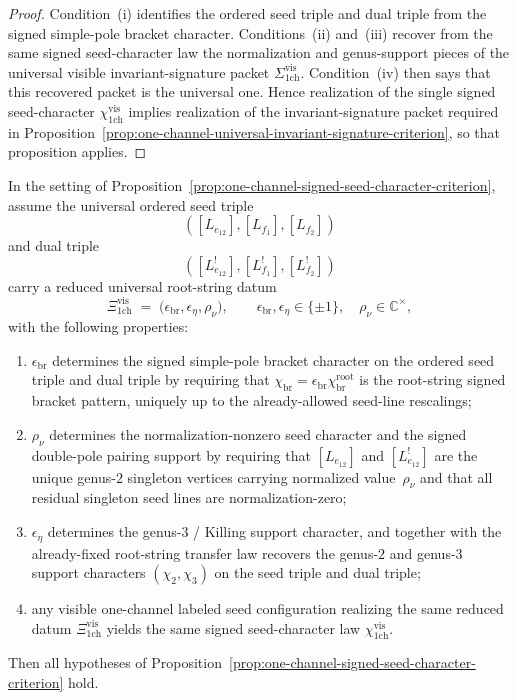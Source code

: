 \begin{proof}
Condition~\textup{(i)} identifies the ordered seed triple and dual
triple from the signed simple-pole bracket character.
Conditions~\textup{(ii)} and~\textup{(iii)} recover from the same
signed seed-character law the normalization and genus-support pieces of the
universal visible invariant-signature packet
$\Sigma_{\mathrm{1ch}}^{\mathrm{vis}}$.
Condition~\textup{(iv)} then says that this recovered packet is the
universal one.  Hence realization of the single signed seed-character
$\chi_{\mathrm{1ch}}^{\mathrm{vis}}$
implies realization of the invariant-signature packet required in
Proposition~\ref{prop:one-channel-universal-invariant-signature-criterion},
so that proposition applies.
\end{proof}

\begin{proposition}\label{prop:one-channel-two-sign-plus-normalization-scalar-criterion}
In the setting of
Proposition~\textup{\ref{prop:one-channel-signed-seed-character-criterion}},
assume the universal ordered seed triple
\[
([L_{e_{12}}],[L_{f_1}],[L_{f_2}])
\]
and dual triple
\[
([L_{e_{12}}^!],[L_{f_1}^!],[L_{f_2}^!])
\]
carry a reduced universal root-string datum
\[
\Xi_{\mathrm{1ch}}^{\mathrm{vis}}
\;=\;
\bigl(\epsilon_{\mathrm{br}},\epsilon_{\eta},\rho_{\nu}\bigr),
\qquad
\epsilon_{\mathrm{br}},\epsilon_{\eta}\in\{\pm 1\},
\quad
\rho_{\nu}\in\mathbb{C}^\times,
\]
with the following properties:
\begin{enumerate}[label=\textup{(\roman*)}]
\item $\epsilon_{\mathrm{br}}$ determines the signed simple-pole
  bracket character on the ordered seed triple and dual triple by
  requiring that
  $\chi_{\mathrm{br}}=\epsilon_{\mathrm{br}}\chi_{\mathrm{br}}^{\mathrm{root}}$
  is the root-string signed bracket pattern, uniquely up to the
  already-allowed seed-line rescalings;
\item $\rho_{\nu}$ determines the normalization-nonzero seed character
  and the signed double-pole pairing support by requiring that
  $[L_{e_{12}}]$ and $[L_{e_{12}}^!]$ are the unique genus-$2$
  singleton vertices carrying normalized value~$\rho_{\nu}$ and that
  all residual singleton seed lines are normalization-zero;
\item $\epsilon_{\eta}$ determines the genus-$3$ / Killing support
  character, and together with the already-fixed root-string transfer
  law recovers the genus-$2$ and genus-$3$ support characters
  $(\chi_2,\chi_3)$ on the seed triple and dual triple;
\item any visible one-channel labeled seed configuration realizing the
  same reduced datum
  $\Xi_{\mathrm{1ch}}^{\mathrm{vis}}$
  yields the same signed seed-character law
  $\chi_{\mathrm{1ch}}^{\mathrm{vis}}$.
\end{enumerate}
Then all hypotheses of
Proposition~\ref{prop:one-channel-signed-seed-character-criterion}
hold.


\end{proposition}
